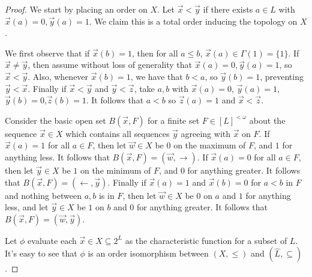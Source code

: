 \documentclass[11pt]{article}
\begin{document}
  \begin{proof}
    We start by placing an order on \(X\). Let \(\vec x<\vec y\) if
    there exists \(a\in L\) with \(\vec x(a)=0,\vec y(a)=1\). We claim this is
    a total order inducing the topology on \(X\).

    We first observe that if \(\vec x(b)=1\), then for all \(a\leq b\),
    \(\vec x(a)\in\Gamma(1)=\{1\}\). If \(\vec x\not=\vec y\), then assume
    without loss of generality that \(\vec x(a)=0,\vec y(a)=1\), so
    \(\vec x<\vec y\). Also, whenever \(\vec x(b)=1\), we have that \(b<a\),
    so \(\vec y(b)=1\), preventing \(\vec y<\vec x\). Finally if
    \(\vec x<\vec y\) and \(\vec y<\vec z\), take \(a,b\) with
    \(\vec x(a)=0\), \(\vec y(a)=1\),\(\vec y(b)=0\),\(\vec z(b)=1\). It
    follows that \(a<b\) so \(\vec z(a)=1\) and \(\vec x<\vec z\).

    Consider the basic open set \(B(\vec x,F)\) for a finite set
    \(F\in [L]^{<\omega}\)
    about the sequence \(\vec x\in X\) which contains all sequences
    \(\vec y\) agreeing with \(\vec x\) on \(F\). If \(\vec x(a)=1\) for all
    \(a\in F\), then let \(\vec w\in X\) be \(0\) on the maximum of \(F\),
    and \(1\) for anything less. It follows that
    \(B(\vec x,F)=(\vec w,\rightarrow)\). If \(\vec x(a)=0\) for all
    \(a\in F\), then let \(\vec y\in X\) be \(1\) on the minimum of \(F\),
    and \(0\) for anything greater. It follows that
    \(B(\vec x,F)=(\leftarrow,\vec y)\). Finally if \(\vec x(a)=1\) and
    \(\vec x(b)=0\) for \(a<b\) in \(F\) and nothing between \(a,b\) is in
    \(F\), then let \(\vec w\in X\) be \(0\) on \(a\)
    and \(1\) for anything less, and let \(\vec y\in X\) be \(1\) on \(b\)
    and \(0\) for anything greater. It follows that
    \(B(\vec x,F)=(\vec w,\vec y)\).

    Let \(\phi\) evaluate each \(\vec x\in X\subseteq 2^L\) as the
    characteristic function for a subset of \(L\). It's easy to see that
    \(\phi\) is an order isomorphism between \((X,\leq)\) and \((\hat L,\subseteq)\).
  \end{proof}

\newpage


\end{document}
